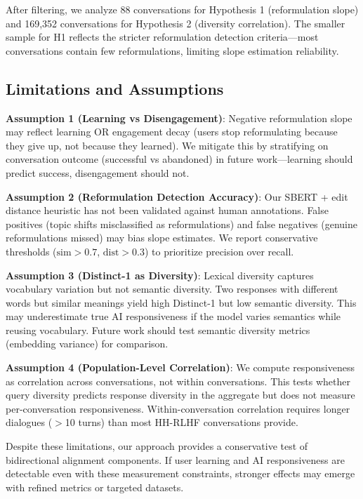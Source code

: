 After filtering, we analyze 88 conversations for Hypothesis 1 (reformulation slope) and 169,352 conversations for Hypothesis 2 (diversity correlation). The smaller sample for H1 reflects the stricter reformulation detection criteria---most conversations contain few reformulations, limiting slope estimation reliability.

\subsection{Limitations and Assumptions}

\textbf{Assumption 1 (Learning vs Disengagement)}: Negative reformulation slope may reflect learning OR engagement decay (users stop reformulating because they give up, not because they learned). We mitigate this by stratifying on conversation outcome (successful vs abandoned) in future work---learning should predict success, disengagement should not.

\textbf{Assumption 2 (Reformulation Detection Accuracy)}: Our SBERT + edit distance heuristic has not been validated against human annotations. False positives (topic shifts misclassified as reformulations) and false negatives (genuine reformulations missed) may bias slope estimates. We report conservative thresholds ($\text{sim} > 0.7$, $\text{dist} > 0.3$) to prioritize precision over recall.

\textbf{Assumption 3 (Distinct-1 as Diversity)}: Lexical diversity captures vocabulary variation but not semantic diversity. Two responses with different words but similar meanings yield high Distinct-1 but low semantic diversity. This may underestimate true AI responsiveness if the model varies semantics while reusing vocabulary. Future work should test semantic diversity metrics (embedding variance) for comparison.

\textbf{Assumption 4 (Population-Level Correlation)}: We compute responsiveness as correlation across conversations, not within conversations. This tests whether query diversity predicts response diversity in the aggregate but does not measure per-conversation responsiveness. Within-conversation correlation requires longer dialogues ($>$10 turns) than most HH-RLHF conversations provide.

Despite these limitations, our approach provides a conservative test of bidirectional alignment components. If user learning and AI responsiveness are detectable even with these measurement constraints, stronger effects may emerge with refined metrics or targeted datasets.
